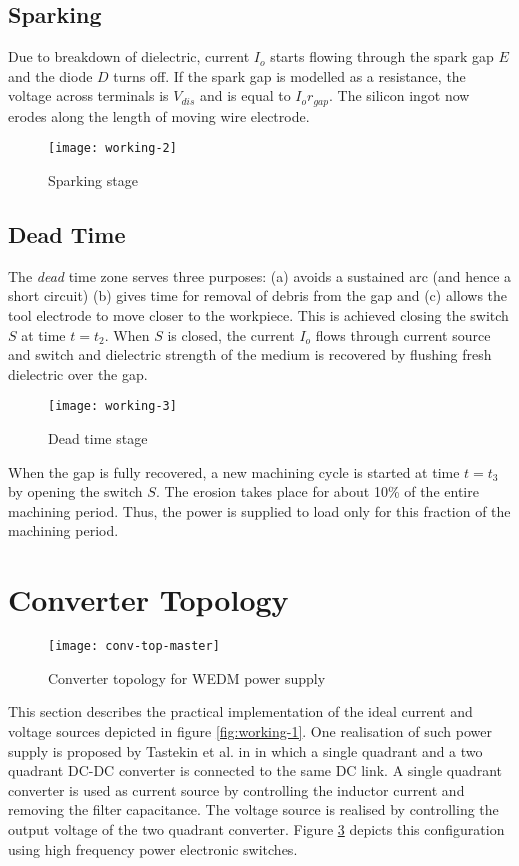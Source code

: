 \subsection{Sparking}
	Due to breakdown of dielectric, current $I_o$ starts flowing through the spark gap $E$ and the diode $D$ turns off. If the spark gap is modelled as a resistance, the voltage across terminals is $V_{dis}$ and is equal to $I_or_{gap}$. The silicon ingot now erodes along the length of moving wire electrode.
	\begin{figure}[H]
		\centering
		\texttt{[image: working-2]}
		\caption{Sparking stage}
		\label{fig:working-2}
	\end{figure}	

\subsection{Dead Time}
	The \emph{dead} time zone serves three purposes: (a) avoids a sustained arc (and hence a short circuit) (b) gives time for removal of debris from the gap and (c) allows the tool electrode to move closer to the workpiece. This is achieved closing the switch $S$ at time $t=t_2$. When $S$ is closed, the current $I_o$ flows through current source and switch and dielectric strength of the medium is recovered by flushing fresh dielectric over the gap.
	\begin{figure}[H]
		\centering
		\texttt{[image: working-3]}
		\caption{Dead time stage}
		\label{fig:working-3}
	\end{figure}
	When the gap is fully recovered, a new machining cycle is started at time $t=t_3$ by opening the switch $S$. The erosion takes place for about 10\% of the entire machining period. Thus, the power is supplied to load only for this fraction of the machining period.

\section{Converter Topology}
	\begin{figure}[h]
		\centering
		\texttt{[image: conv-top-master]}
		\caption{Converter topology for WEDM power supply}
		\label{fig:working-3}
	\end{figure}
	This section describes the practical implementation of the ideal current and voltage sources depicted in figure \ref{fig:working-1}. One realisation of such power supply is proposed by Tastekin et al. in \cite{tastekin2009novel} in which a single quadrant and a two quadrant DC-DC converter is connected to the same DC link. A single quadrant converter is used as current source by controlling the inductor current and removing the filter capacitance. The voltage source is realised by controlling the output voltage of the two quadrant converter. Figure \ref{fig:working-3} depicts this configuration using high frequency power electronic switches.

